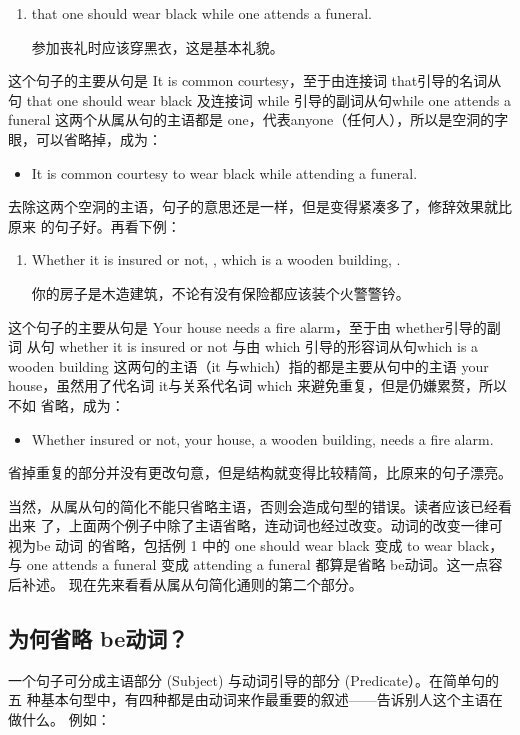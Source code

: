 \begin{enumerate}
\item {}   that one should wear
  black while one attends a funeral.

  参加丧礼时应该穿黑衣，这是基本礼貌。
\end{enumerate}
这个句子的主要从句是 It is common courtesy，至于由连接词 that引导的名词从
句 that one should wear black 及连接词 while 引导的副词从句while one attends
a funeral 这两个从属从句的主语都是 one，代表anyone（任何人），所以是空洞的字
眼，可以省略掉，成为：
\begin{itemize}
\item It is common courtesy to wear black while attending a funeral.
\end{itemize}
去除这两个空洞的主语，句子的意思还是一样，但是变得紧凑多了，修辞效果就比原来
的句子好。再看下例：
\begin{enumerate}[resume]
\item Whether it is insured or not, , which is a wooden
  building,  .

  你的房子是木造建筑，不论有没有保险都应该装个火警警钤。
\end{enumerate}
这个句子的主要从句是 Your house needs a fire alarm，至于由 whether引导的副词
从句 whether it is insured or not 与由 which 引导的形容词从句which is a
wooden building 这两句的主语（it 与which）指的都是主要从句中的主语 your
house，虽然用了代名词 it与关系代名词 which 来避免重复，但是仍嫌累赘，所以不如
省略，成为：
\begin{itemize}
\item Whether insured or not, your house, a wooden building, needs a fire
  alarm.
\end{itemize}
省掉重复的部分并没有更改句意，但是结构就变得比较精简，比原来的句子漂亮。

当然，从属从句的简化不能只省略主语，否则会造成句型的错误。读者应该已经看出来
了，上面两个例子中除了主语省略，连动词也经过改变。动词的改变一律可视为be 动词
的省略，包括例 1 中的 one should wear black 变成 to wear black，与 one
attends a funeral 变成 attending a funeral 都算是省略 be动词。这一点容后补述。
现在先来看看从属从句简化通则的第二个部分。

\subsection{为何省略 be动词？}

一个句子可分成主语部分 (Subject) 与动词引导的部分 (Predicate）。在简单句的五
种基本句型中，有四种都是由动词来作最重要的叙述——告诉别人这个主语在做什么。
例如：

